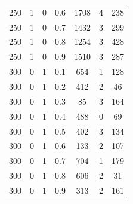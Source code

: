 \documentclass[a4paper,oneside,14pt]{extreport}
\begin{document}
\begin{table}[h]
\begin{center}
\begin{tabular}{|c|c|c|c|c|c|c|}
		250 & 1 & 0 & 0.6 & 1708 & 4 & 238 \\
		250 & 1 & 0 & 0.7 & 1432 & 3 & 299 \\
		250 & 1 & 0 & 0.8 & 1254 & 3 & 428 \\
		250 & 1 & 0 & 0.9 & 1510 & 3 & 287 \\
		300 & 0 & 1 & 0.1 & 654 & 1 & 128 \\
		300 & 0 & 1 & 0.2 & 412 & 2 & 46 \\
		300 & 0 & 1 & 0.3 & 85 & 3 & 164 \\
		300 & 0 & 1 & 0.4 & 488 & 0 & 69 \\
		300 & 0 & 1 & 0.5 & 402 & 3 & 134 \\
		300 & 0 & 1 & 0.6 & 133 & 2 & 107 \\
		300 & 0 & 1 & 0.7 & 704 & 1 & 179 \\
		300 & 0 & 1 & 0.8 & 606 & 2 & 31 \\
		300 & 0 & 1 & 0.9 & 313 & 2 & 161 \\
		\hline	
	\end{tabular}
\end{center}
\end{table}
\end{document}
